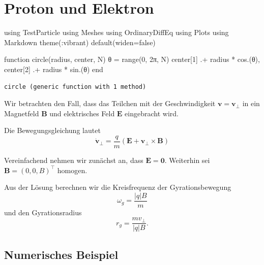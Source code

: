 \documentclass[
  a4paper,
  DIV=11]{scrreprt}
\newenvironment{Shaded}{\begin{snugshade}}{\end{snugshade}}
\newcommand{\BuiltInTok}[1]{\textcolor[rgb]{0.00,0.23,0.31}{#1}}
\newcommand{\ConstantTok}[1]{\textcolor[rgb]{0.56,0.35,0.01}{#1}}
\newcommand{\FloatTok}[1]{\textcolor[rgb]{0.68,0.00,0.00}{#1}}
\newcommand{\FunctionTok}[1]{\textcolor[rgb]{0.28,0.35,0.67}{#1}}
\newcommand{\ImportTok}[1]{\textcolor[rgb]{0.00,0.46,0.62}{#1}}
\newcommand{\KeywordTok}[1]{\textcolor[rgb]{0.00,0.23,0.31}{#1}}
\newcommand{\NormalTok}[1]{\textcolor[rgb]{0.00,0.23,0.31}{#1}}
\newcommand{\OperatorTok}[1]{\textcolor[rgb]{0.37,0.37,0.37}{#1}}
\begin{document}
\hypertarget{proton-und-elektron}{%
\chapter{Proton und Elektron}\label{proton-und-elektron}}

\begin{Shaded}
\begin{Highlighting}[]
\ImportTok{using} \BuiltInTok{TestParticle}
\ImportTok{using} \BuiltInTok{Meshes}
\ImportTok{using} \BuiltInTok{OrdinaryDiffEq}
\ImportTok{using} \BuiltInTok{Plots}
\ImportTok{using} \BuiltInTok{Markdown}
\FunctionTok{theme}\NormalTok{(}\OperatorTok{:}\NormalTok{vibrant)}
\FunctionTok{default}\NormalTok{(widen}\OperatorTok{=}\ConstantTok{false}\NormalTok{)}

\KeywordTok{function} \FunctionTok{circle}\NormalTok{(radius, center, N)}
\NormalTok{    θ }\OperatorTok{=} \FunctionTok{range}\NormalTok{(}\FloatTok{0}\NormalTok{, }\FloatTok{2}\NormalTok{π, N)}
\NormalTok{    center[}\FloatTok{1}\NormalTok{] }\OperatorTok{.+}\NormalTok{ radius }\OperatorTok{*} \FunctionTok{cos}\NormalTok{.(θ), center[}\FloatTok{2}\NormalTok{] }\OperatorTok{.+}\NormalTok{ radius }\OperatorTok{*} \FunctionTok{sin}\NormalTok{.(θ)}
\KeywordTok{end}
\end{Highlighting}
\end{Shaded}

\begin{verbatim}
circle (generic function with 1 method)
\end{verbatim}

Wir betrachten den Fall, dass das Teilchen mit der Geschwindigkeit
\(\mathbf v = \mathbf v_\perp\) in ein Magnetfeld \(\mathbf B\) und
elektrisches Feld \(\mathbf E\) eingebracht wird.

Die Bewegungsgleichung lautet \[
\dot{\mathbf v}_\perp = \frac{q}{m} \left( \mathbf E +  \mathbf v_\perp \times \mathbf B \right)
\]

Vereinfachend nehmen wir zunächst an, dass \(\mathbf E = \mathbf 0\).
Weiterhin sei \(\mathbf B = (0, 0, B)^\top\) homogen.

Aus der Lösung berechnen wir die Kreisfrequenz der Gyrationsbewegung \[
\omega_g = \frac{|q| B}{m}
\] und den Gyrationsradius \[
r_g = \frac{m v_\perp}{|q| B}.
\]

\hypertarget{numerisches-beispiel}{%
\section{Numerisches Beispiel}\label{numerisches-beispiel}}
\end{document}
